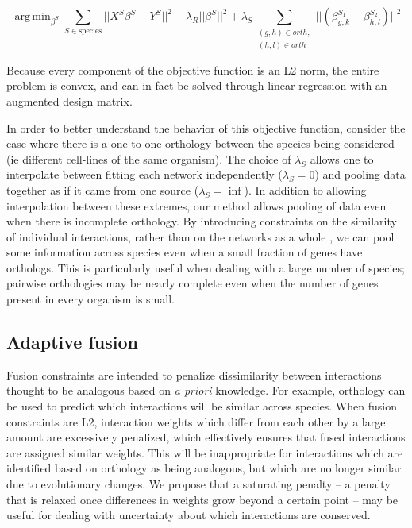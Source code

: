\documentclass[11pt]{article}
\DeclareMathOperator*{\argmin}{arg\,min}
\begin{document}
\begin{equation}
\argmin_{\beta^S} \displaystyle\sum_{S \in \text{species}} \vert \vert X^S\beta^S - Y^S \vert \vert ^2 + \lambda_R \vert \vert \beta^S \vert \vert ^2 + \displaystyle \lambda_S \sum_{\substack{(g,h) \in orth,\\
 (h,l) \in orth}} \vert \vert (\beta^{S_1}_{g,k} - \beta^{S_2}_{h,l}) \vert \vert ^2
\end{equation}

Because every component of the objective function is an L2 norm, the entire problem is convex, and can in fact be solved through linear regression with an augmented design matrix. %

In order to better understand the behavior of this objective function, consider the case where there is a one-to-one orthology between the species being considered (ie different cell-lines of the same organism). The choice of $\lambda_S$ allows one to interpolate between fitting each network independently ($\lambda_S=0$) and pooling data together as if it came from one source ($\lambda_S=\inf$). In addition to allowing interpolation between these extremes, our method allows pooling of data even when there is incomplete orthology. By introducing constraints on the similarity of individual interactions, rather than on the networks as a whole \cite{liu2011temporal}, we can pool some information across species even when a small fraction of genes have orthologs. This is particularly useful when dealing with a large number of species; pairwise orthologies may be nearly complete even when the number of genes present in every organism is small. 


\subsection{Adaptive fusion}
Fusion constraints are intended to penalize dissimilarity between interactions thought to be analogous based on \textit{a priori} knowledge. For example, orthology can be used to predict which interactions will be similar across species. When fusion constraints are L2, interaction weights which differ from each other by a large amount are excessively penalized, which effectively ensures that fused interactions are assigned similar weights. This will be inappropriate for interactions which are identified based on orthology as being analogous, but which are no longer similar due to evolutionary changes. We propose that a saturating penalty -- a penalty that is relaxed once differences in weights grow beyond a certain point -- may be useful for dealing with uncertainty about which interactions are conserved. 
\end{document}
